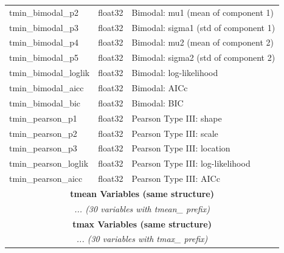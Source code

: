 ﻿\documentclass[12pt,a4paper]{report}
\begin{document}
\begin{longtable}{p{4cm} p{2cm} p{8cm}}
    tmin\_bimodal\_p2 & float32 & Bimodal: mu1 (mean of component 1) \\
    tmin\_bimodal\_p3 & float32 & Bimodal: sigma1 (std of component 1) \\
    tmin\_bimodal\_p4 & float32 & Bimodal: mu2 (mean of component 2) \\
    tmin\_bimodal\_p5 & float32 & Bimodal: sigma2 (std of component 2) \\
    tmin\_bimodal\_loglik & float32 & Bimodal: log-likelihood \\
    tmin\_bimodal\_aicc & float32 & Bimodal: AICc \\
    tmin\_bimodal\_bic & float32 & Bimodal: BIC \\
    tmin\_pearson\_p1 & float32 & Pearson Type III: shape \\
    tmin\_pearson\_p2 & float32 & Pearson Type III: scale \\
    tmin\_pearson\_p3 & float32 & Pearson Type III: location \\
    tmin\_pearson\_loglik & float32 & Pearson Type III: log-likelihood \\
    tmin\_pearson\_aicc & float32 & Pearson Type III: AICc \\
    
    \midrule
    \multicolumn{3}{c}{\textbf{tmean Variables (same structure)}} \\
    \midrule
    \multicolumn{3}{c}{\textit{... (30 variables with tmean\_ prefix)}} \\
    
    \midrule
    \multicolumn{3}{c}{\textbf{tmax Variables (same structure)}} \\
    \midrule
    \multicolumn{3}{c}{\textit{... (30 variables with tmax\_ prefix)}} \\
    
\end{longtable}
\end{document}
